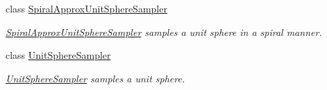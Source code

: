 \begin{DoxyCompactItemize}
class \hyperlink{classnext__best__view_1_1SpiralApproxUnitSphereSampler}{\-Spiral\-Approx\-Unit\-Sphere\-Sampler}
\begin{DoxyCompactList}\small\item\em \hyperlink{classnext__best__view_1_1SpiralApproxUnitSphereSampler}{\-Spiral\-Approx\-Unit\-Sphere\-Sampler} samples a unit sphere in a spiral manner. \end{DoxyCompactList}\item 
class \hyperlink{classnext__best__view_1_1UnitSphereSampler}{\-Unit\-Sphere\-Sampler}
\begin{DoxyCompactList}\small\item\em \hyperlink{classnext__best__view_1_1UnitSphereSampler}{\-Unit\-Sphere\-Sampler} samples a unit sphere. \end{DoxyCompactList}\end{DoxyCompactItemize}
